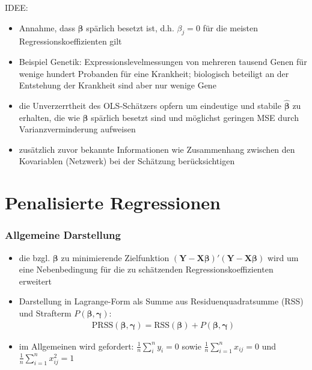 \documentclass{beamer}
\begin{document}
\begin{frame}
	IDEE:
	\begin{itemize}
	\pause \item Annahme, dass $\boldsymbol{\beta}$ spärlich besetzt ist, d.h. $\beta_j=0$ für die meisten Regressionskoeffizienten gilt
	\pause \item Beispiel Genetik: Expressionslevelmessungen von mehreren tausend Genen für wenige hundert Probanden für eine Krankheit; biologisch beteiligt an der Entstehung der Krankheit sind aber nur wenige Gene
	\pause \item die Unverzerrtheit des OLS-Schätzers {\glqq}opfern{\grqq} um eindeutige und stabile $\boldsymbol{\hat{\beta}}$ zu erhalten, die wie $\boldsymbol{\beta}$ spärlich besetzt sind und möglichst geringen MSE durch Varianzverminderung aufweisen
	\pause \item zusätzlich zuvor bekannte Informationen wie Zusammenhang zwischen den Kovariablen (Netzwerk) bei der Schätzung berücksichtigen
	\end{itemize}
\end{frame}


\section{Penalisierte Regressionen}
\begin{frame} %
\frametitle{Allgemeine Darstellung}
  \begin{itemize}
  \item die bzgl. $\boldsymbol{\beta}$ zu minimierende Zielfunktion $(\mathbf{Y}-\mathbf{X}\boldsymbol{\beta})'(\mathbf{Y}-\mathbf{X}\boldsymbol{\beta})$ wird um eine Nebenbedingung für die zu schätzenden Regressionskoeffizienten erweitert 
  \item Darstellung in Lagrange-Form als Summe aus Residuenquadratsumme (RSS) und Strafterm $P(\boldsymbol{\beta}, \boldsymbol{\gamma})$:
  \begin{align*}
  \text{PRSS}(\boldsymbol{\beta}, \boldsymbol{\gamma})=\text{RSS}(\boldsymbol{\beta})+P(\boldsymbol{\beta}, \boldsymbol{\gamma})
  \end{align*}
  \item im Allgemeinen wird gefordert: $\frac{1}{n}\sum_{i}^{n}y_i =0$ sowie $\frac{1}{n}\sum_{i=1}^{n}x_{ij}=0$ und $\frac{1}{n}\sum_{i=1}^{n}x_{ij}^2=1$
  \end{itemize} 
\end{frame}
\end{document}
